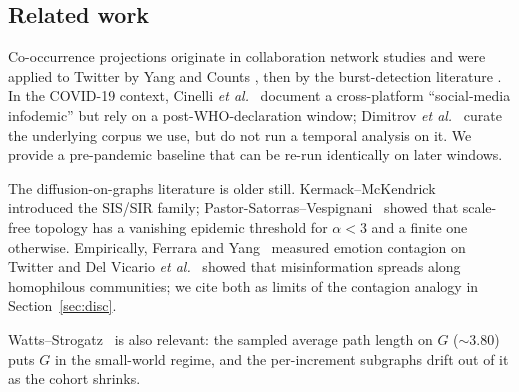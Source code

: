 \documentclass[conference]{IEEEtran}
\begin{document}
\subsection{Related work}
\label{sec:related}
Co-occurrence projections originate in collaboration network
studies \cite{newman2001scientific} and were applied to Twitter
by Yang and Counts \cite{yang2010predicting}, then by the
burst-detection literature \cite{kleinberg2003bursty}.  In the
COVID-19 context, Cinelli \textit{et al.}~\cite{cinelli2020covid19}
document a cross-platform ``social-media infodemic'' but rely on
a post-WHO-declaration window; Dimitrov
\textit{et al.}~\cite{dimitrov2020tweetscov19} curate the
underlying corpus we use, but do not run a temporal analysis on
it.  We provide a pre-pandemic baseline that can be re-run
identically on later windows.

The diffusion-on-graphs literature is older still.
Kermack--McKendrick~\cite{kermack1927contribution} introduced
the SIS/SIR family;
Pastor-Satorras--Vespignani~\cite{pastor2001epidemic} showed
that scale-free topology has a vanishing epidemic threshold for
$\alpha < 3$ and a finite one otherwise.  Empirically,
Ferrara and Yang~\cite{ferrara2015measuring} measured emotion
contagion on Twitter and Del Vicario
\textit{et al.}~\cite{delvicario2016spreading} showed that
misinformation spreads along homophilous communities; we cite
both as limits of the contagion analogy in
Section~\ref{sec:disc}.

Watts--Strogatz~\cite{watts1998collective} is also relevant:
the sampled average path length on $G$ ($\sim 3.80$) puts $G$
in the small-world regime, and the per-increment subgraphs
drift out of it as the cohort shrinks.
\end{document}
